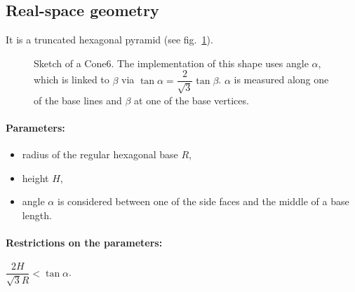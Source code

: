 \subsection{Real-space geometry}
It is a truncated hexagonal pyramid (see fig.~\ref{fig:cone6}). 

\begin{figure}[ht]
\hfill
{}
\hfill
{}
\hfill
\caption{Sketch of a Cone6.  The implementation of this shape uses angle
  $\alpha$, which is linked to $\beta$ via $\tan \alpha = \dfrac{2}{\sqrt{3}} \tan 
  \beta$. $\alpha$ is measured along one of the base lines and $\beta$
  at one of the base vertices.}
\label{fig:cone6}
\end{figure}

\FloatBarrier


\paragraph{Parameters:}
\begin{itemize}
\item radius of the regular hexagonal base $R$,
\item height $H$,
\item angle $\alpha$ is considered between one of the side faces and
  the middle of a base length. 
\end{itemize}

\paragraph{Restrictions on the parameters:} $\dfrac{2H}{\sqrt{3}R}< \tan{\alpha}$.

